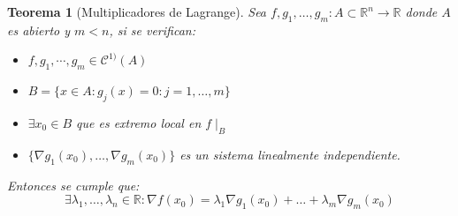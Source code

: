 \documentclass[10pt,a4paper,openright]{book}
\theoremstyle{break}
\newtheorem*{theo}{Teorema}
\begin{document}
\begin{theo}[Multiplicadores de Lagrange]
Sea $f, g_1, \ldots, g_m : A \subset \mathbb{R}^n \to \mathbb{R}$ donde $A$ es abierto y $m < n$, si se verifican:
\begin{itemize}
\item $f, g_1, \cdots, g_m \in \mathcal{C}^{1)} (A)$
\item $B = \{x \in A: g_j (x) = 0 : j =1, \ldots, m\}$
\item $\exists x_0 \in B$ que es extremo local en $f\mid_B$
\item $\{\nabla g_1(x_0), \ldots, \nabla g_m(x_0)\}$ es un sistema linealmente independiente.
\end{itemize}
Entonces se cumple que:
$$\exists \lambda_1, \ldots, \lambda_n \in \mathbb{R} : \nabla f(x_0) = \lambda_1 \nabla g_1 (x_0) + \ldots + \lambda_m \nabla g_m (x_0)$$
\end{theo}
\end{document}
